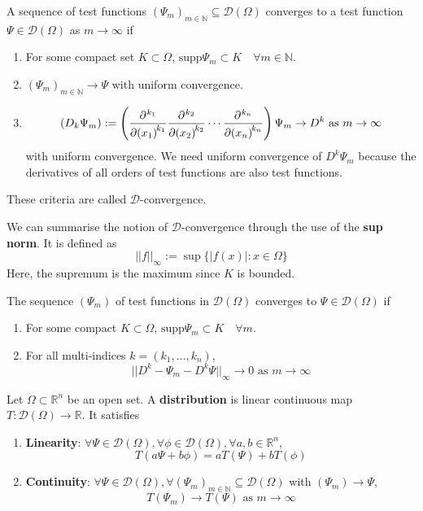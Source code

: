 \begin{definition}
	A sequence of test functions ${(\Psi_m)}_{m \in \mathbb{N}} \subseteq \mathcal{D}(\Omega)$ converges to a test function $\Psi \in \mathcal{D}(\Omega)$ as $m \rightarrow \infty$ if
	\begin{enumerate}
		\item For some compact set $K \subset \Omega$, $\text{supp} \Psi_m \subset K \quad \forall m \in \mathbb{N}$.
		\item ${(\Psi_m)}_{m \in \mathbb{N}} \rightarrow \Psi$ with uniform convergence.
		\item \[
			{(D_k \Psi_m)} := \left( \diffp[k_1]{}{x_1} \diffp[k_2]{}{x_2} \cdots \diffp[k_n]{}{x_n} \right) \Psi_m \rightarrow D^k \text{ as } m \rightarrow \infty
		\]
		with uniform convergence. We need uniform convergence of $D^k \Psi_m$ because the derivatives of all orders of test functions are also test functions.
	\end{enumerate}
	These criteria are called $\mathcal{D}$-convergence.
\end{definition}

\begin{definition}
	We can summarise the notion of $\mathcal{D}$-convergence through the use of the \textbf{sup norm}. It is defined as
	\[
		||f||_{\infty} := \sup \{ |f(x)|: x \in \Omega \}
	\]
	Here, the supremum is the maximum since $K$ is bounded.
\end{definition}

\begin{definition}
	The sequence ${(\Psi_m)}$ of test functions in $\mathcal{D}(\Omega)$ converges to $\Psi \in \mathcal{D} (\Omega)$ if
	\begin{enumerate}
		\item For some compact $K \subset \Omega$, $\text{supp} \Psi_m \subset K \quad \forall m$.
		\item For all multi-indices $k = (k_1, \dots, k_n)$,
		\[
			|| D^k - \Psi_m - D^k \Psi ||_{\infty} \rightarrow 0 \text{ as } m \rightarrow \infty
		\]
	\end{enumerate}
\end{definition}

\begin{definition}
	Let $\Omega \subset \mathbb{R}^n$ be an open set. A \textbf{distribution} is linear continuous map $T: \mathcal{D}(\Omega) \rightarrow \mathbb{R}$. It satisfies
	\begin{enumerate}
		\item \textbf{Linearity}: $\forall \Psi \in \mathcal{D}(\Omega), \forall \phi \in \mathcal{D}(\Omega), \forall a, b \in \mathbb{R}^n$,
		\[
			T(a \Psi + b \phi) = a T(\Psi) + b T(\phi)
		\]
		\item \textbf{Continuity}: $\forall \Psi \in \mathcal{D}(\Omega), \forall {(\Psi_m)}_{m \in \mathbb{N}} \subseteq \mathcal{D}(\Omega)$ with $(\Psi_m) \rightarrow \Psi$,
		\[
			T(\Psi_m) \rightarrow T(\Psi) \text{ as } m \rightarrow \infty
		\]
	\end{enumerate}
\end{definition}

